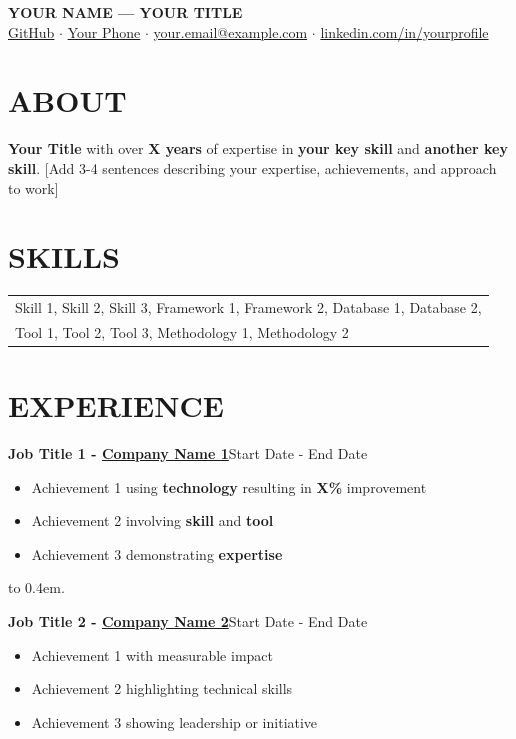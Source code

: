 \documentclass[11pt,a4paper]{article}
\newcommand{\entry}[4]{
  \noindent\textbf{#1 - \href{#4}{#2}}\hfill{#3}\par
  \vspace{0.5em}
}
\newcommand{\dotsep}{\leavevmode\xleaders\hbox to 0.4em{\hfil.\hfil}\hfill\kern0pt}
\begin{document}
\begin{center}
\huge\textbf{YOUR NAME — YOUR TITLE}\\
\vspace{0.5em}
\normalsize
\href{https://github.com/yourusername}{GitHub} $\cdot$ 
\href{tel:+1234567890}{Your Phone} $\cdot$ 
\href{mailto:your.email@example.com}{your.email@example.com} $\cdot$ 
\href{https://www.linkedin.com/in/yourprofile}{linkedin.com/in/yourprofile}
\end{center}

\section*{ABOUT}
\textbf{Your Title} with over \textbf{X years} of expertise in \textbf{your key skill} and \textbf{another key skill}. 
[Add 3-4 sentences describing your expertise, achievements, and approach to work]

\section*{SKILLS}
\begin{tabular}{@{}p{\textwidth}@{}}
Skill 1, Skill 2, Skill 3, Framework 1, Framework 2, Database 1, Database 2, \\
Tool 1, Tool 2, Tool 3, Methodology 1, Methodology 2
\end{tabular}

\section*{EXPERIENCE}
\entry{Job Title 1}{Company Name 1}{Start Date - End Date}{https://company1.com}
\begin{itemize}
  \item Achievement 1 using \textbf{technology} resulting in \textbf{X\%} improvement
  \item Achievement 2 involving \textbf{skill} and \textbf{tool}
  \item Achievement 3 demonstrating \textbf{expertise}
\end{itemize}

\dotsep

\entry{Job Title 2}{Company Name 2}{Start Date - End Date}{https://company2.com}
\begin{itemize}
  \item Achievement 1 with measurable impact
  \item Achievement 2 highlighting technical skills
  \item Achievement 3 showing leadership or initiative
\end{itemize}
\end{document}
